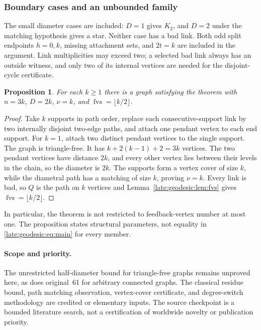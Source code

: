 \documentclass[11pt,a4paper]{article}
\newtheorem{proposition}[theorem]{Proposition}
\theoremstyle{definition}\newtheorem{definition}[theorem]{Definition}
\theoremstyle{remark}\newtheorem{remark}[theorem]{Remark}
\begin{document}
\subsubsection{Boundary cases and an unbounded family}
The small diameter cases are included: $D=1$ gives $K_2$, and $D=2$ under
the matching hypothesis gives a star. Neither case has a bad link.
Both odd split endpoints $h=0,k$, missing attachment sets, and $2t=k$
are included in the argument. Link multiplicities may exceed two; a
selected bad link always has an outside witness, and only two of its
internal vertices are needed for the disjoint-cycle certificate.

\begin{proposition}\label{late:geodesic:prop:family}
For each $k\ge1$ there is a graph satisfying the theorem with
$n=3k$, $D=2k$, $\nu=k$, and $\operatorname{fvs}=\lfloor k/2\rfloor$.
\end{proposition}
\begin{proof}
Take $k$ supports in path order, replace each consecutive-support link
by two internally disjoint two-edge paths, and attach one pendant vertex
to each end support. For $k=1$, attach two distinct pendant vertices to
the single support. The graph is triangle-free. It has
$k+2(k-1)+2=3k$ vertices. The two pendant vertices have distance $2k$,
and every other vertex lies between their levels in the chain, so the
diameter is $2k$. The supports form a vertex cover of size $k$, while
the diametral path has a matching of size $k$, proving $\nu=k$.
Every link is bad, so $Q$ is the path on $k$ vertices and
Lemma~\ref{late:geodesic:lem:fvs} gives $\operatorname{fvs}=\lfloor k/2\rfloor$.
\end{proof}
In particular, the theorem is not restricted to feedback-vertex number
at most one. The proposition states structural parameters, not equality
in \eqref{late:geodesic:eq:main} for every member.

\paragraph{Scope and priority.}
The unrestricted half-diameter bound for triangle-free graphs remains
unproved here, as does original~61 for arbitrary connected graphs.
The classical residue bound, path matching observation, vertex-cover
certificate, and degree-switch methodology are credited or elementary
inputs. The source checkpoint is a bounded literature search, not a
certification of worldwide novelty or publication priority.
\end{document}
